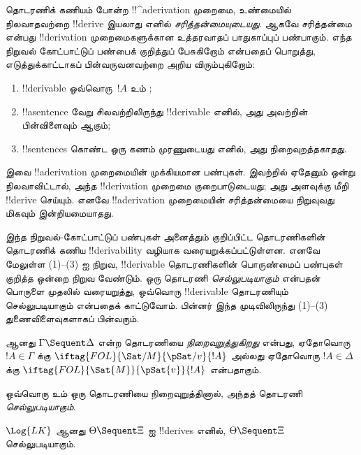 \documentclass[../../../include/open-logic-section]{subfiles}
\begin{document}
      {}
      {}


\begin{explain}
தொடரணிக் கணியம் போன்ற !!^a{derivation} முறைமை, உண்மையில் நிலவாதவற்றை
!!{derive} இயலாது எனில் \emph{சரித்தன்மையுடையது}. ஆகவே சரித்தன்மை என்பது
!!{derivation} முறைமைகளுக்கான உத்தரவாதப் பாதுகாப்புப் பண்பாகும். எந்த நிறுவல்
கோட்பாட்டுப் பண்பைக் குறித்துப் பேசுகிறோம் என்பதைப் பொறுத்து, எடுத்துக்காட்டாகப்
பின்வருவனவற்றை அறிய விரும்புகிறோம்:
\begin{enumerate}
\item !!{derivable} ஒவ்வொரு~$!A$ உம் ;
\item !!a{sentence} வேறு சிலவற்றிலிருந்து !!{derivable} எனில், அது அவற்றின்
  பின்விளைவும் ஆகும்;
\item !!{sentence}s கொண்ட ஒரு கணம் முரணுடையது எனில், அது நிறைவுறத்தகாதது.
\end{enumerate}
இவை !!a{derivation} முறைமையின் முக்கியமான பண்புகள். இவற்றில் ஏதேனும் ஒன்று
நிலவாவிட்டால், அந்த !!{derivation} முறைமை குறைபாடுடையது; அது அளவுக்கு மீறி
!!{derive} செய்யும். எனவே !!a{derivation} முறைமையின் சரித்தன்மையை நிறுவுவது
மிகவும் இன்றியமையாதது.

இந்த நிறுவல்-கோட்பாட்டுப் பண்புகள் அனைத்தும் குறிப்பிட்ட தொடரணிகளின் தொடரணிக்
கணிய !!{derivability} வழியாக வரையறுக்கப்பட்டுள்ளன. எனவே மேலுள்ள (1)--(3) ஐ
நிறுவ, !!{derivable} தொடரணிகளின் பொருண்மைப் பண்புகள் குறித்த ஒன்றை நிறுவ
வேண்டும். ஒரு தொடரணி \emph{செல்லுபடியாகும்} என்பதன் பொருளை முதலில் வரையறுத்து,
ஒவ்வொரு !!{derivable} தொடரணியும் செல்லுபடியாகும் என்பதைக் காட்டுவோம். பின்னர்
இந்த முடிவிலிருந்து (1)--(3) துணைவிளைவுகளாகப் பின்வரும்.
\end{explain}

\begin{defn}
 ஆனது $\Gamma \Sequent \Delta$ என்ற
தொடரணியை \emph{நிறைவுறுத்துகிறது} என்பது, ஏதோவொரு $!A \in \Gamma$ க்கு
$\iftag{FOL}{\Sat/{M}}{\pSat/{v}}{!A}$ அல்லது ஏதோவொரு $!A \in \Delta$ க்கு
$\iftag{FOL}{\Sat{M}}{\pSat{v}}{!A}$ என்பதாகும்.

ஒவ்வொரு  உம் ஒரு தொடரணியை நிறைவுறுத்தினால், அந்தத்
தொடரணி \emph{செல்லுபடியாகும்}.
\end{defn}

\begin{thm}[சரித்தன்மை]
 $\Log{LK}$ ஆனது $\Theta \Sequent \Xi$ ஐ
!!{derive}s எனில், $\Theta \Sequent \Xi$ செல்லுபடியாகும்.
\end{thm}
\end{document}
